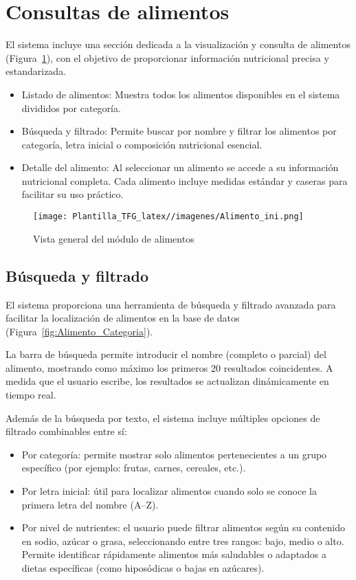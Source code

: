 \section{Consultas de alimentos}
El sistema incluye una sección dedicada a la visualización y consulta de alimentos (Figura~\ref{fig:Alimento_ini}), con el objetivo de proporcionar información nutricional precisa y estandarizada. 

\begin{itemize}
    \item Listado de alimentos: Muestra todos los alimentos disponibles en el sistema divididos por categoría.
    
    \item Búsqueda y filtrado: Permite buscar por nombre y filtrar los alimentos por categoría, letra inicial o composición nutricional esencial.

    \item Detalle del alimento: Al seleccionar un alimento se accede a su información nutricional completa. Cada alimento incluye medidas estándar y caseras para facilitar su uso práctico.
\end{itemize}

\begin{figure}[H]
    \centering
    \texttt{[image: Plantilla\_TFG\_latex//imagenes/Alimento\_ini.png]}
    \caption{Vista general del módulo de alimentos}
    \label{fig:Alimento_ini}
\end{figure}

\subsection{Búsqueda y filtrado}
El sistema proporciona una herramienta de búsqueda y filtrado avanzada para facilitar la localización de alimentos en la base de datos (Figura~\ref{fig:Alimento_Categoria}).

La barra de búsqueda permite introducir el nombre (completo o parcial) del alimento, mostrando como máximo los primeros 20 resultados coincidentes. A medida que el usuario escribe, los resultados se actualizan dinámicamente en tiempo real. 

Además de la búsqueda por texto, el sistema incluye múltiples opciones de filtrado combinables entre sí:

\begin{itemize}
    \item Por categoría: permite mostrar solo alimentos pertenecientes a un grupo específico (por ejemplo: frutas, carnes, cereales, etc.).
    
    \item Por letra inicial: útil para localizar alimentos cuando solo se conoce la primera letra del nombre (A–Z).
    
    \item Por nivel de nutrientes: el usuario puede filtrar alimentos según su contenido en sodio, azúcar o grasa, seleccionando entre tres rangos: bajo, medio o alto. Permite identificar rápidamente alimentos más saludables o adaptados a dietas específicas (como hiposódicas o bajas en azúcares).
\end{itemize}

